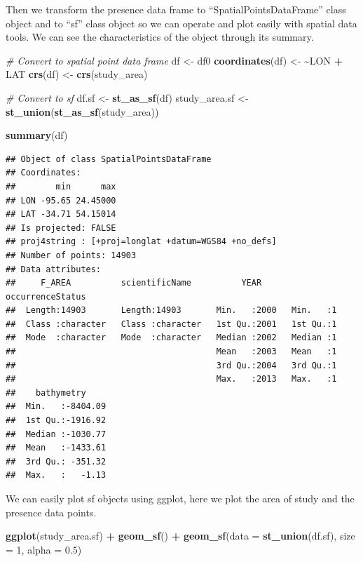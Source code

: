 \documentclass[
]{book}
\newenvironment{Shaded}{\begin{snugshade}}{\end{snugshade}}
\newcommand{\AttributeTok}[1]{\textcolor[rgb]{0.13,0.29,0.53}{#1}}
\newcommand{\CommentTok}[1]{\textcolor[rgb]{0.56,0.35,0.01}{\textit{#1}}}
\newcommand{\DecValTok}[1]{\textcolor[rgb]{0.00,0.00,0.81}{#1}}
\newcommand{\ErrorTok}[1]{\textcolor[rgb]{0.64,0.00,0.00}{\textbf{#1}}}
\newcommand{\FloatTok}[1]{\textcolor[rgb]{0.00,0.00,0.81}{#1}}
\newcommand{\FunctionTok}[1]{\textcolor[rgb]{0.13,0.29,0.53}{\textbf{#1}}}
\newcommand{\NormalTok}[1]{#1}
\newcommand{\OtherTok}[1]{\textcolor[rgb]{0.56,0.35,0.01}{#1}}
\newcommand{\SpecialCharTok}[1]{\textcolor[rgb]{0.81,0.36,0.00}{\textbf{#1}}}
\begin{document}
Then we transform the presence data frame to ``SpatialPointsDataFrame'' class object and to ``sf'' class object so we can operate and plot easily with spatial data tools. We can see the characteristics of the object through its summary.

\begin{Shaded}
\begin{Highlighting}[]
\CommentTok{\# Convert to spatial point data frame}
\NormalTok{df }\OtherTok{\textless{}{-}}\NormalTok{ df0}
\FunctionTok{coordinates}\NormalTok{(df) }\OtherTok{\textless{}{-}} \ErrorTok{\textasciitilde{}}\NormalTok{LON }\SpecialCharTok{+}\NormalTok{ LAT}
\FunctionTok{crs}\NormalTok{(df) }\OtherTok{\textless{}{-}} \FunctionTok{crs}\NormalTok{(study\_area)}

\CommentTok{\# Convert to sf}
\NormalTok{df.sf }\OtherTok{\textless{}{-}} \FunctionTok{st\_as\_sf}\NormalTok{(df)}
\NormalTok{study\_area.sf }\OtherTok{\textless{}{-}} \FunctionTok{st\_union}\NormalTok{(}\FunctionTok{st\_as\_sf}\NormalTok{(study\_area))}


\FunctionTok{summary}\NormalTok{(df)}
\end{Highlighting}
\end{Shaded}

\begin{verbatim}
## Object of class SpatialPointsDataFrame
## Coordinates:
##        min      max
## LON -95.65 24.45000
## LAT -34.71 54.15014
## Is projected: FALSE 
## proj4string : [+proj=longlat +datum=WGS84 +no_defs]
## Number of points: 14903
## Data attributes:
##     F_AREA          scientificName          YEAR      occurrenceStatus
##  Length:14903       Length:14903       Min.   :2000   Min.   :1       
##  Class :character   Class :character   1st Qu.:2001   1st Qu.:1       
##  Mode  :character   Mode  :character   Median :2002   Median :1       
##                                        Mean   :2003   Mean   :1       
##                                        3rd Qu.:2004   3rd Qu.:1       
##                                        Max.   :2013   Max.   :1       
##    bathymetry      
##  Min.   :-8404.09  
##  1st Qu.:-1916.92  
##  Median :-1030.77  
##  Mean   :-1433.61  
##  3rd Qu.: -351.32  
##  Max.   :   -1.13
\end{verbatim}

We can easily plot sf objects using ggplot, here we plot the area of study and the presence data points.

\begin{Shaded}
\begin{Highlighting}[]
\FunctionTok{ggplot}\NormalTok{(study\_area.sf) }\SpecialCharTok{+} \FunctionTok{geom\_sf}\NormalTok{() }\SpecialCharTok{+} \FunctionTok{geom\_sf}\NormalTok{(}\AttributeTok{data =} \FunctionTok{st\_union}\NormalTok{(df.sf),}
    \AttributeTok{size =} \DecValTok{1}\NormalTok{, }\AttributeTok{alpha =} \FloatTok{0.5}\NormalTok{)}
\end{Highlighting}
\end{Shaded}
\end{document}
